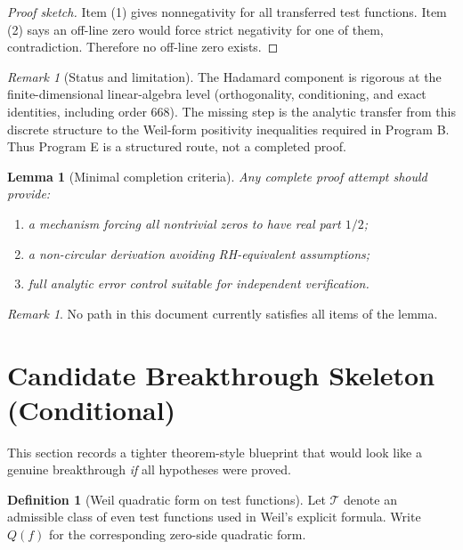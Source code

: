\documentclass[11pt]{article}
\theoremstyle{plain}
\newtheorem{lemma}[theorem]{Lemma}
\theoremstyle{definition}
\newtheorem{definition}[theorem]{Definition}
\theoremstyle{remark}
\newtheorem{remark}[theorem]{Remark}
\begin{document}
\begin{proof}[Proof sketch]
Item (1) gives nonnegativity for all transferred test functions.
Item (2) says an off-line zero would force strict negativity for one of them, contradiction.
Therefore no off-line zero exists.
\end{proof}

\begin{remark}[Status and limitation]
The Hadamard component is rigorous at the finite-dimensional linear-algebra level (orthogonality,
conditioning, and exact identities, including order $668$).
The missing step is the analytic transfer from this discrete structure to the Weil-form positivity
inequalities required in Program B. Thus Program E is a structured route, not a completed proof.
\end{remark}

\begin{lemma}[Minimal completion criteria]
Any complete proof attempt should provide:
\begin{enumerate}
  \item a mechanism forcing all nontrivial zeros to have real part $1/2$;
  \item a non-circular derivation avoiding RH-equivalent assumptions;
  \item full analytic error control suitable for independent verification.
\end{enumerate}
\end{lemma}

\begin{remark}
No path in this document currently satisfies all items of the lemma.
\end{remark}

\section{Candidate Breakthrough Skeleton (Conditional)}
This section records a tighter theorem-style blueprint that would look like a genuine breakthrough
\emph{if} all hypotheses were proved.

\begin{definition}[Weil quadratic form on test functions]
Let $\mathcal{T}$ denote an admissible class of even test functions used in Weil's explicit formula.
Write $Q(f)$ for the corresponding zero-side quadratic form.
\end{definition}
\end{document}
